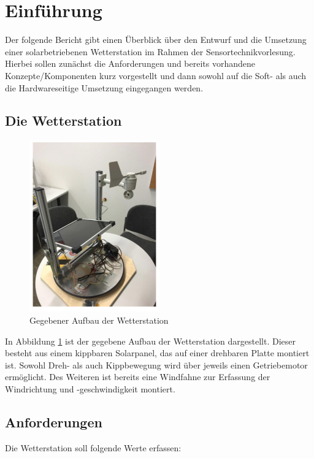 \section{Einführung}\label{sec:einfuehrung}
Der folgende Bericht gibt einen Überblick über den Entwurf und die Umsetzung einer solarbetriebenen Wetterstation im Rahmen der Sensortechnikvorlesung. Hierbei sollen zunächst die Anforderungen und bereits vorhandene Konzepte/Komponenten kurz vorgestellt und dann sowohl auf die Soft- als auch die Hardwareseitige Umsetzung eingegangen werden.

\subsection{Die Wetterstation}\label{subsec:Wetterstation}
\begin{figure}[H]
  \centering
  \includegraphics[width=0.5\textwidth]{./img/Wetterstation.png}
  \caption{Gegebener Aufbau der Wetterstation}\label{fig.wetterstation}
\end{figure}

In Abbildung \ref{fig.wetterstation} ist der gegebene Aufbau der Wetterstation dargestellt. Dieser besteht aus einem kippbaren Solarpanel, das auf einer drehbaren Platte montiert ist. Sowohl Dreh- als auch Kippbewegung wird über jeweils einen Getriebemotor ermöglicht. Des Weiteren ist bereits eine Windfahne zur Erfassung der Windrichtung und -geschwindigkeit montiert.

\subsection{Anforderungen}\label{subsec:Anforderungen}
Die Wetterstation soll folgende Werte erfassen:

